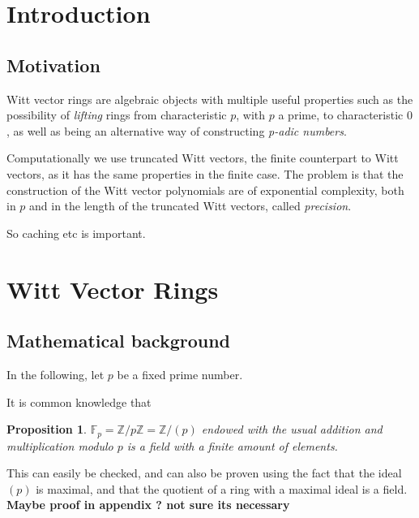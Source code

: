 \documentclass[oneside, a4paper, onecolumn, 11pt]{article}
\newtheorem{proposition}{Proposition}
\theoremstyle{definition}
\begin{document}
\newpage
\tableofcontents
\newpage


\section{Introduction}

\subsection{Motivation}
Witt vector rings are algebraic objects with multiple useful properties such as the possibility of \emph{lifting} rings from characteristic $p$, with $p$ a prime, to characteristic $0$, as well as being an alternative way of constructing \emph{p-adic numbers}. 

Computationally we use truncated Witt vectors, the finite counterpart to Witt vectors, as it has the same properties in the finite case. The problem is that the construction of the Witt vector polynomials are of exponential complexity, both in $p$ and in the length of the truncated Witt vectors, called \emph{precision}.

So caching etc is important.

\section{Witt Vector Rings}
\subsection{Mathematical background}\label{subsec:background}
\newline

In the following, let $p$ be a fixed prime number. 

It is common knowledge that 
\begin{proposition}
  $\mathbb{F}_p = \mathbb{Z}/p\mathbb{Z} = \mathbb{Z}/(p)$ endowed with the usual addition and multiplication modulo $p$ is a field with a finite amount of elements.
\end{proposition} 
This can easily be checked, and can also be proven using the fact that the ideal $(p)$ is maximal, and that the quotient of a ring with a maximal ideal is a field.  \textbf{Maybe proof in appendix ? not sure its necessary}
\end{document}

